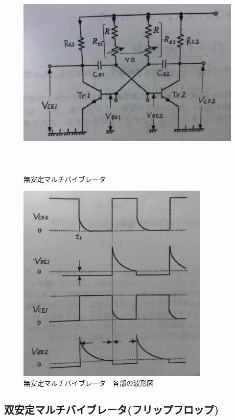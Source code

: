 \documentclass[12pt]{jarticle}
\begin{document}
\clearpage
\begin{figure}[h]
    \begin{center}
        \includegraphics[bb=0 0 3308 2186,height=10cm]{parusu_5.jpg}
    \end{center}
    \caption{無安定マルチバイブレータ}
    \label{fig5}
    \begin{center}
        \includegraphics[bb=0 0 2256 2366,height=10cm]{parusu_6.jpg}
    \end{center}
    \caption{無安定マルチバイブレータ　各部の波形図}
    \label{fig6}
\end{figure}
\clearpage

\subsection{双安定マルチバイブレータ(フリップフロップ)}
\end{document}
